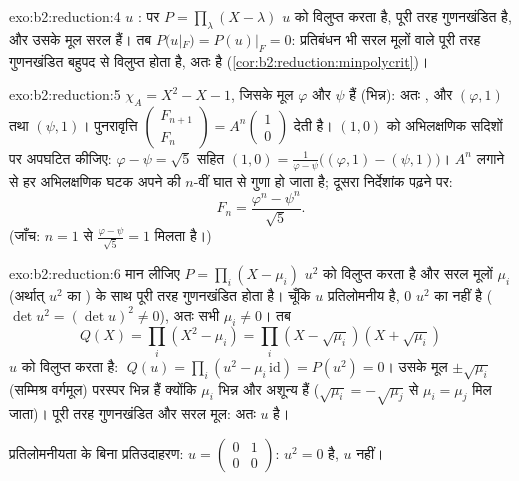 \begin{solution}{exo:b2:reduction:4}
$u$ :  पर $P = \prod_{\lambda}(X - \lambda)$ $u$ को विलुप्त करता है, पूरी तरह
गुणनखंडित है, और उसके मूल सरल हैं। तब $P(u|_F) =
P(u)|_F = 0$: प्रतिबंधन भी सरल मूलों वाले
पूरी तरह गुणनखंडित बहुपद से विलुप्त होता है, अतः  है (\cref{cor:b2:reduction:minpolycrit})।
\end{solution}

\begin{solution}{exo:b2:reduction:5}
$\chi_A = X^2 - X - 1$, जिसके मूल $\varphi$ और $\psi$ हैं (भिन्न): अतः , और  $(\varphi, 1)$ तथा $(\psi, 1)$। पुनरावृत्ति $\begin{pmatrix} F_{n+1}\\ F_n \end{pmatrix} =
A^n \begin{pmatrix}1\\ 0\end{pmatrix}$ देती है। $(1, 0)$ को अभिलक्षणिक सदिशों
पर अपघटित कीजिए: $\varphi - \psi = \sqrt5$ सहित $(1,0) = \frac{1}{\varphi - \psi}\bigl((\varphi, 1) -
(\psi, 1)\bigr)$। $A^n$ लगाने से हर अभिलक्षणिक घटक अपने
 की $n$-वीं घात से गुणा हो जाता है; दूसरा निर्देशांक
पढ़ने पर:
\[
F_n = \frac{\varphi^n - \psi^n}{\sqrt 5} .
\]
(जाँच: $n = 1$ से $\frac{\varphi - \psi}{\sqrt5} = 1$ मिलता है।)
\end{solution}

\begin{solution}{exo:b2:reduction:6}
मान लीजिए $P = \prod_i (X - \mu_i)$ $u^2$ को विलुप्त करता है और सरल मूलों $\mu_i$ (अर्थात् $u^2$ का
) के साथ पूरी तरह गुणनखंडित होता है। चूँकि $u$ प्रतिलोमनीय है,
$0$ $u^2$ का  नहीं है ($\det u^2 = (\det u)^2 \neq 0$), अतः सभी $\mu_i \neq 0$। तब
\[
Q(X) = \prod_i (X^2 - \mu_i) = \prod_i (X - \sqrt{\mu_i})(X +
\sqrt{\mu_i})
\]
$u$ को विलुप्त करता है: $\;Q(u) = \prod_i (u^2 - \mu_i\,\mathrm{id}) =
P(u^2) = 0$। उसके मूल $\pm
\sqrt{\mu_i}$ (सम्मिश्र वर्गमूल) परस्पर
भिन्न हैं क्योंकि $\mu_i$ भिन्न और अशून्य हैं ($\sqrt{\mu_i} = -\sqrt{\mu_j}$ से $\mu_i = \mu_j$ मिल जाता)।
पूरी तरह गुणनखंडित और सरल मूल: अतः $u$  है।

प्रतिलोमनीयता के बिना प्रतिउदाहरण: $u = \begin{pmatrix} 0 & 1\\
0 & 0\end{pmatrix}$: $u^2 = 0$  है, $u$ नहीं।
\end{solution}

